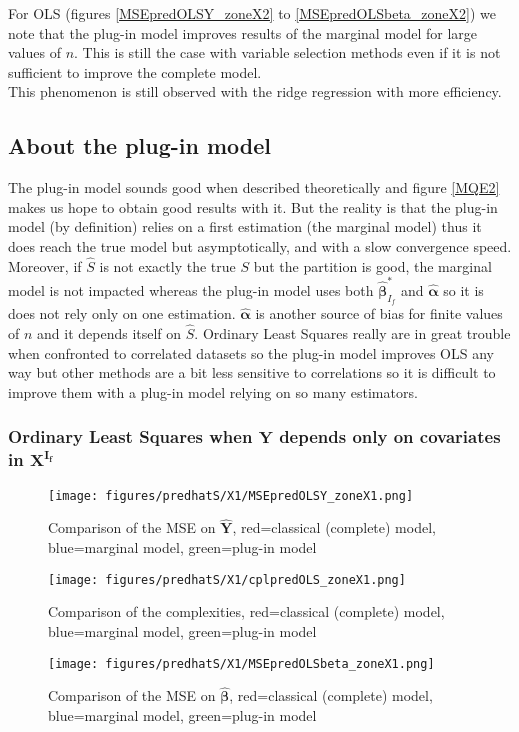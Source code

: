 \documentclass[12pt,a4paper]{report}
\begin{document}
For OLS (figures \ref{MSEpredOLSY_zoneX2} to \ref{MSEpredOLSbeta_zoneX2}) we note that the plug-in model improves results of the marginal model for large values of $n$. This is still the case with variable selection methods even if it is not sufficient to improve the complete model. \\
This phenomenon is still observed with the ridge regression with more efficiency.

\subsection{About the plug-in model}
	The plug-in model sounds good when described theoretically and figure \ref{MQE2} makes us hope to obtain good results with it. But the reality is that the plug-in model (by definition) relies on a first estimation (the marginal model) thus it does reach the true model but asymptotically, and with a slow convergence speed. Moreover, if $\hat{S}$ is not exactly the true $S$ but the partition is good, the marginal model is not impacted whereas the plug-in model uses both $\hat{\boldsymbol{\beta}}^*_{I_f}$ and $\hat{\boldsymbol{\alpha}}$ so it is does not rely only on one estimation. $\hat{\boldsymbol{\alpha}}$ is another source of bias for finite values of $n$ and it depends itself on $\hat{S}$. Ordinary Least Squares really are in great trouble when confronted to correlated datasets so the plug-in model improves OLS any way but other methods are a bit less sensitive to correlations so it is difficult to improve them with a plug-in model relying on so many estimators. 
\newpage
\subsubsection{Ordinary Least Squares when $\boldsymbol{Y}$ depends only on covariates in $\boldsymbol{X^{I_f}}$}

	\begin{figure}[h!]
	\centering
		  \texttt{[image: figures/predhatS/X1/MSEpredOLSY\_zoneX1.png]}
		\caption{Comparison of the MSE on $\hat{\boldsymbol{Y}}$, red=classical (complete) model, blue=marginal model, green=plug-in model}\label{MSEpredOLSY_zoneX1}
	\end{figure}
	\begin{figure}[h!]
	\centering
		  \texttt{[image: figures/predhatS/X1/cplpredOLS\_zoneX1.png]}
		\caption{Comparison of the complexities, red=classical (complete) model, blue=marginal model, green=plug-in model}\label{cplpredOLS_zoneX1}
	\end{figure}
	\begin{figure}[h!]
	\centering
		  \texttt{[image: figures/predhatS/X1/MSEpredOLSbeta\_zoneX1.png]}
		\caption{Comparison of the MSE on $\hat{\boldsymbol{\beta}}$, red=classical (complete) model, blue=marginal model, green=plug-in model}\label{MSEpredOLSbeta_zoneX1}
	\end{figure}
	\FloatBarrier
\newpage
\end{document}
